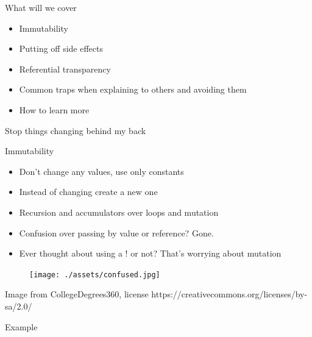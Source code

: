 \documentclass[aspectratio=169]{beamer}
\begin{document}
\begin{frame}
  \begin{center}
    \Huge What will we cover
  \end{center}
  \begin{itemize}
    \item Immutability
    \item Putting off side effects
    \item Referential transparency
    \item Common traps when explaining to others and avoiding them
    \item How to learn more
  \end{itemize}
\end{frame}

\begin{frame}
  \begin{center}
    \Huge Stop things changing behind my back
  \end{center}
\end{frame}

\begin{frame}
  \begin{center}
    \Huge Immutability
  \end{center}
  \begin{itemize}
    \item Don't change any values, use only constants
    \item Instead of changing create a new one
    \item Recursion and accumulators over loops and mutation
    \item Confusion over passing by value or reference? Gone.
    \item Ever thought about using a ! or not? That's worrying about mutation
  \end{itemize}
\end{frame}

\begin{frame}
  \begin{figure}[p]
    \texttt{[image: ./assets/confused.jpg]}
  \end{figure}
  \tiny Image from CollegeDegrees360, license https://creativecommons.org/licenses/by-sa/2.0/
\end{frame}

\begin{frame}
  \begin{center}
    \Huge Example
  \end{center}
\end{frame}
\end{document}
